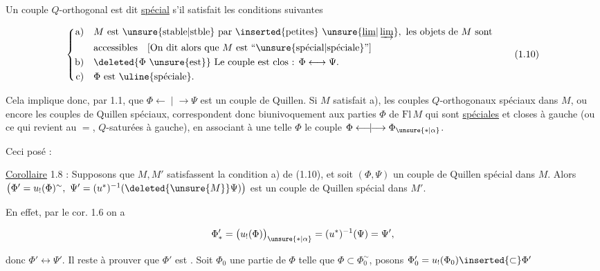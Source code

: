 Un couple $Q$-orthogonal \inserted{$\Phi\longleftrightarrow\Psi$} est dit  \uline{spécial}
s'il satisfait les conditions suivantes

\[
\left\{\begin{aligned}
\text{a)}\quad &M\ \text{est \unsure{stable|stble} par \inserted{petites} }\unsure{\underline{\lim}|\varinjlim},\ \text{les objets de }M\text{ sont}\\
&\text{accessibles}\quad [\text{On dit alors que }M\text{ est ``\unsure{spécial|spéciale}''}]\\
\text{b)}\quad &\deleted{\Phi\ \text{\unsure{est}}}\ \text{Le couple est clos : }\Phi\longleftrightarrow\Psi.\\
\text{c)}\quad &\Phi\ \text{est \uline{spéciale}.}
\end{aligned}\right.\tag*{(1.10)}
\]

Cela implique donc, par 1.1, que $\Phi \mathrel{\longleftarrow\!\mid\!\longrightarrow} \Psi$ est
un couple de Quillen. Si $M$ satisfait a),
les couples $Q$-orthogonaux spéciaux dans $M$,
ou encore les couples de Quillen spéciaux,
correspondent donc biunivoquement aux
parties $\Phi$ de $\mathrm{Fl}\,M$ qui sont \uline{spéciales} et
closes à gauche (ou ce qui revient au $=$, $Q$-saturées
à gauche), en  associant à une telle
$\Phi$ le couple $\Phi \mathrel{\longleftarrow\!\mid\!\longrightarrow} \Phi_{\unsure{*|\alpha}}$.

Ceci posé :

\uline{Corollaire} 1.8 : Supposons que $M,M'$ satisfassent
la condition a) de (1.10), et soit $(\Phi,\Psi)$
un couple de Quillen spécial dans $M$. Alors
$\big(\Phi'=u_!(\Phi)^{\sim},\ \Psi'=(u^*)^{-1}(\deleted{\unsure{M}}\Psi)\big)$ est un
couple de Quillen spécial dans $M'$.

En effet, par le cor. 1.6 on a

\[
\Phi'_*=\big(u_!(\Phi)\big)_{\unsure{*|\alpha}}=(u^{*})^{-1}(\Psi)=\Psi',
\]

donc $\Phi'\longleftrightarrow\Psi'$. Il reste à prouver que
$\Phi'$ est . Soit $\Phi_0$ une partie  de
$\Phi$ telle que $\Phi\subset\Phi_0^{\sim}$, posons $\Phi_0'=u_!(\Phi_0)\inserted{\subset}\Phi'$
